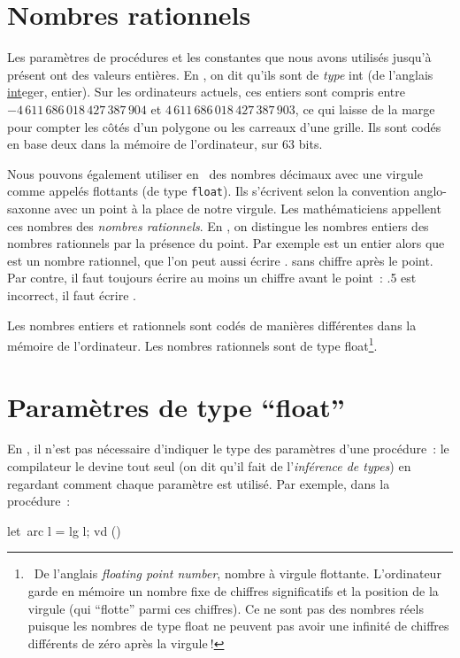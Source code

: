 \section{Nombres rationnels}
Les paramètres de procédures et les constantes que nous avons utilisés jusqu'à
présent ont des valeurs entières. En \ocaml, on dit qu'ils sont de {\em type}
{\idt int} (de l'anglais \underline{int}eger, entier). Sur les ordinateurs actuels, ces
entiers sont compris entre $-4\,611\,686\,018\,427\,387\,904$ et
$4\,611\,686\,018\,427\,387\,903$, ce qui laisse de la marge pour compter les côtés d'un
polygone ou les carreaux d'une grille. Ils sont codés en base deux dans la mémoire
de l'ordinateur, sur 63 bits.

Nous pouvons également utiliser en \ocaml\ des nombres décimaux avec une virgule comme {} appelés flottants (de type \texttt{float}). Ils
s'écrivent selon la convention anglo-saxonne  avec un point à la place de notre
virgule. Les mathématiciens appellent ces nombres des {\em nombres rationnels}. En \ocaml, on
distingue les nombres entiers des nombres rationnels par la présence du point. Par exemple
{} est un entier alors que {} est un nombre rationnel, que l'on peut
aussi écrire {.} sans chiffre après le point. Par contre, il faut toujours écrire
au moins un chiffre avant le point~: {\idt .5} est incorrect, il faut écrire {}.

Les nombres entiers et rationnels sont codés de manières différentes dans la mémoire
de l'ordinateur. Les nombres rationnels sont de type {\idt float}\footnote{\ De
l'anglais {\em floating point number}, nombre à virgule flottante. L'ordinateur
garde en mémoire un nombre fixe de chiffres significatifs et la position de la virgule
(qui ``flotte'' parmi ces chiffres). Ce ne sont pas des nombres
réels puisque les nombres de type {\idt float} ne peuvent pas avoir une infinité de chiffres
différents de zéro après la virgule$\:$!}.

\section{Paramètres de type ``float''}
En \ocaml, il n'est pas nécessaire d'indiquer le type des paramètres d'une
procédure~: le compilateur le devine tout seul (on dit qu'il fait de
l'{\em inférence de types}) en regardant comment chaque paramètre
est utilisé. Par exemple, dans la procédure~:

\begin{center}
{\mcl let}\ {\idt arc l = lg l; vd ()}
\end{center}

